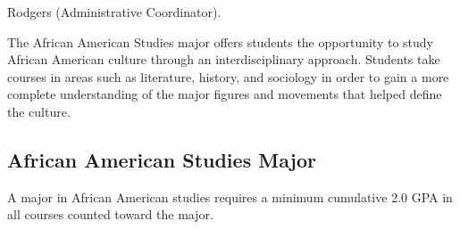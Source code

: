 \documentclass[
  letterpaper,
]{scrbook}
\begin{document}
Rodgers (Administrative Coordinator).

The African American Studies major offers students the opportunity to
study African American culture through an interdisciplinary approach.
Students take courses in areas such as literature, history, and
sociology in order to gain a more complete understanding of the major
figures and movements that helped define the culture.

\subsection{African American Studies
Major}\label{african-american-studies-major}

A major in African American studies requires a minimum cumulative 2.0
GPA in all courses counted toward the major.
\end{document}
